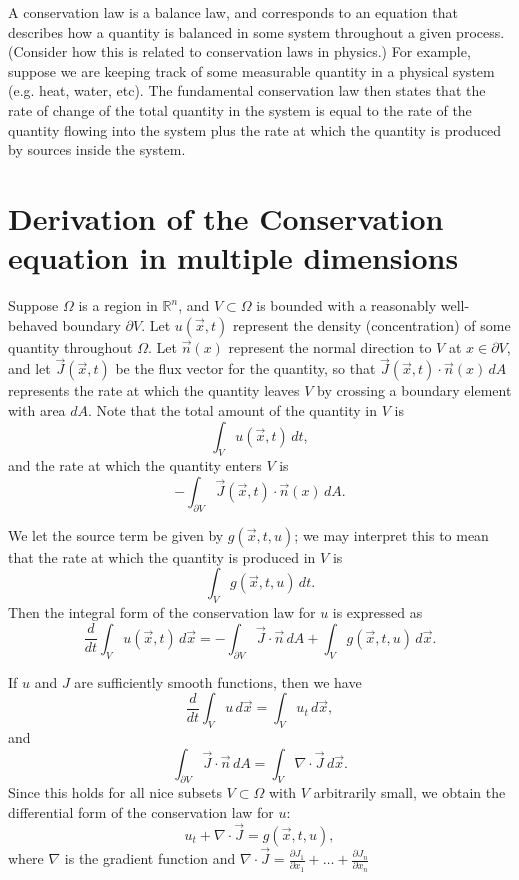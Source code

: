 \label{lab:HeatFlow}

A conservation law is a balance law, and corresponds to an equation that describes how a quantity is balanced in some system throughout a given process.
(Consider how this is related to conservation laws in physics.)
For example, suppose we are keeping track of some measurable quantity in a physical system (e.g. heat, water, etc).
The fundamental conservation law then states that the rate of change of the total quantity in the system is equal to the rate of the quantity flowing into the system plus the rate at which the quantity is produced by sources inside the system.

\section*{Derivation of the Conservation equation in multiple dimensions}
Suppose $\Omega$ is a region in $\mathbb{R}^n$, and $V \subset \Omega$ is bounded with a reasonably well-behaved boundary $\partial V$.
Let $u(\vec{x},t)$ represent the density (concentration) of some quantity throughout $\Omega$.
Let $\vec{n}(x)$ represent the normal direction to $V$ at $x \in \partial V$, and let $\vec{J}(\vec{x},t)$ be the flux vector for the quantity, so that $\vec{J}(\vec{x},t) \cdot \vec{n}(x) \, dA$ represents the rate at which the quantity leaves $V$ by crossing a boundary element with area $dA$.
Note that the total amount of the quantity in $V$ is
\[ \int_V u(\vec{x},t)\, dt,\]
and the rate at which the quantity enters $V$ is
\[-\int_{\partial V} \vec{J}(\vec{x},t) \cdot \vec{n}(x) \, dA.\]

We let the source term be given by $g(\vec{x},t,u)$; we may interpret this to mean that the rate at which the quantity is produced in $V$ is
\[\int_V g(\vec{x},t,u)\, dt.\]
Then the integral form of the conservation law for $u$ is expressed as
\[\frac{d}{dt} \int_V u(\vec{x},t) \, d\vec{x} = -\int_{\partial V} \vec{J}\cdot \vec{n}\, dA + \int_V g(\vec{x},t,u)\, d\vec{x}.\]

If $u$ and $J$ are sufficiently smooth functions, then we have
\[ \frac{d}{dt} \int_V u\, d\vec{x} = \int_V u_t \, d\vec{x},\]
and
\[ \int_{\partial V} \vec{J}\cdot \vec{n}\, dA = \int_V \nabla \cdot \vec{J}\, d\vec{x} .\]
Since this holds for all nice subsets $V \subset \Omega$ with $V$ arbitrarily small, we obtain the differential form of the conservation law for $u$:
\[ u_t + \nabla \cdot \vec{J} = g(\vec{x},t,u) ,\]
where $\nabla$ is the gradient function and $\nabla \cdot \vec{J} = \frac{\partial J_1}{\partial x_1} + \dots + \frac{\partial J_n}{\partial x_n}$

